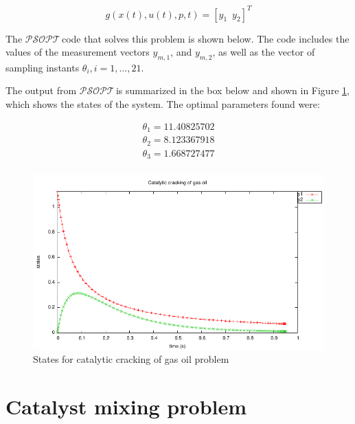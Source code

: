 \documentclass[a4paper,11pt]{report}    %
\newcommand{\psopt}{$\mathcal{PSOPT}$\,}  %
\newenvironment{shadedframe}{%
  \def\FrameCommand{\fcolorbox{black}{shadecolor}}%
  \MakeFramed {\FrameRestore}}
{\endMakeFramed}
\begin{document}
\[
    g( x(t), u(t), p, t ) = \left[ y_1\,\,\,y_2\right]^T
\]


The
\psopt code that solves this problem is shown below. The code includes
the values of the measurement vectors $y_{m,1}$, and $y_{m,2}$, as well
as the vector of sampling instants $\theta_i, i=1,\ldots,21$.

\tiny
\begin{shadedframe}

\end{shadedframe}
\normalsize

The output from \psopt is summarized in the box below and shown in Figure \ref{fig:cracking_states},
which shows the states of the system. The optimal parameters found were:

\begin{equation}
\begin{aligned}
 \theta_1  = 11.40825702 \\
 \theta_2 = 8.123367918 \\	
 \theta_3 = 1.668727477 \\	
\end{aligned}
\end{equation}

\begin{shadedframe}

\end{shadedframe}

\begin{figure}
  \centering
  \includegraphics{../examples/cracking/cracking_states}
  \caption{States for catalytic cracking of gas oil problem}
  \label{fig:cracking_states}
\end{figure}

\section{Catalyst mixing problem}
\end{document}
